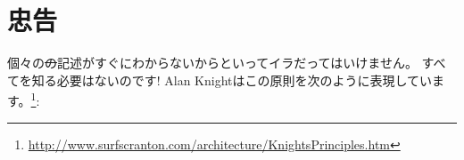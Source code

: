 \documentclass[a4paper,10pt,twoside]{book}
\begin{document}
\section*{忠告}


個々の\st の記述がすぐにわからないからといってイラだってはいけません。
すべてを知る必要はないのです!
Alan Knightはこの原則を次のように表現しています。\footnote{\url{http://www.surfscranton.com/architecture/KnightsPrinciples.htm}}:
\end{document}
